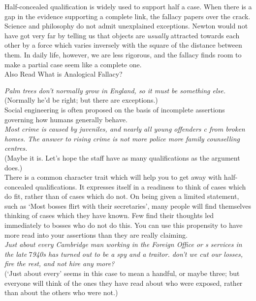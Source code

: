 \documentclass[a4paper,12pt,single,pdftex]{scrartcl}
\begin{document}
{    
      Half-concealed qualification is widely used to support half a case. When there is a gap in the evidence supporting a complete link, the fallacy papers over the crack. Science and philosophy do not admit unexplained exceptions. Newton would not have got very far by telling us that objects are {\em usually} attracted towards each other by a force which varies inversely with the square of the distance between them. In daily life, however, we are less rigorous, and the fallacy finds room to make a partial case seem like a complete one.
    \\

    
      

      
        Also Read  What is Analogical Fallacy?
      
    
    
      {\em Palm trees don’t normally grow in England, so it must be something else.}
    \\

    
      (Normally he’d be right; but there are exceptions.)
    \\

    
      Social engineering is often proposed on the basis of incomplete assertions governing how humans generally behave.
    \\

    
      {\em Most crime is caused by juveniles, and nearly all young offenders c from broken homes. The answer to rising crime is not more police more family counselling centres.}
    \\

    
      (Maybe it is. Let’s hope the staff have as many qualifications as the argument does.)
    \\

    
      There is a common character trait which will help you to get away with half-concealed qualifications. It expresses itself in a readiness to think of cases which do fit, rather than of cases which do not. On being given a limited statement, such as ‘Most bosses flirt with their secretaries’, many people will find themselves thinking of cases which they have known. Few find their thoughts led immediately to bosses who do not do this. You can use this propensity to have more read into your assertions than they are really claiming.
    \\

    
      {\em Just about every Cambridge man working in the Foreign Office or s services in the late }7{\em 940s has turned out to be a spy and a traitor. don’t we cut our losses, fire the rest, and not hire any more?}
    \\

    
      (‘Just about every’ seems in this case to mean a handful, or maybe three; but everyone will think of the ones they have read about who were exposed, rather than about the others who were not.)
    \\

  }
\end{document}
